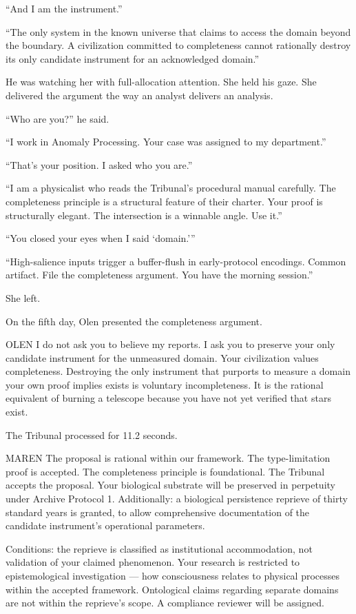 \enquote{And I am the instrument.}

\enquote{The only system in the known universe that claims to access the domain beyond the boundary. A civilization committed to completeness cannot rationally destroy its only candidate instrument for an acknowledged domain.}

He was watching her with full-allocation attention. She held his gaze. She delivered the argument the way an analyst delivers an analysis.

\enquote{Who are you?} he said.

\enquote{I work in Anomaly Processing. Your case was assigned to my department.}

\enquote{That's your position. I asked who you are.}

\enquote{I am a physicalist who reads the Tribunal's procedural manual carefully. The completeness principle is a structural feature of their charter. Your proof is structurally elegant. The intersection is a winnable angle. Use it.}

\enquote{You closed your eyes when I said \enquote*{domain.}}

\enquote{High-salience inputs trigger a buffer-flush in early-protocol encodings. Common artifact. File the completeness argument. You have the morning session.}

She left.

\quietbreak

On the fifth day, Olen presented the completeness argument.

\begin{tribunal}{OLEN}
I do not ask you to believe my reports. I ask you to preserve your only candidate instrument for the unmeasured domain. Your civilization values completeness. Destroying the only instrument that purports to measure a domain your own proof implies exists is voluntary incompleteness. It is the rational equivalent of burning a telescope because you have not yet verified that stars exist.
\end{tribunal}

The Tribunal processed for 11.2 seconds.

\begin{tribunal}{MAREN}
The proposal is rational within our framework. The type-limitation proof is accepted. The completeness principle is foundational. The Tribunal accepts the proposal. Your biological substrate will be preserved in perpetuity under Archive Protocol 1. Additionally: a biological persistence reprieve of thirty standard years is granted, to allow comprehensive documentation of the candidate instrument's operational parameters.

Conditions: the reprieve is classified as institutional accommodation, not validation of your claimed phenomenon. Your research is restricted to epistemological investigation — how consciousness relates to physical processes within the accepted framework. Ontological claims regarding separate domains are not within the reprieve's scope. A compliance reviewer will be assigned.
\end{tribunal}

